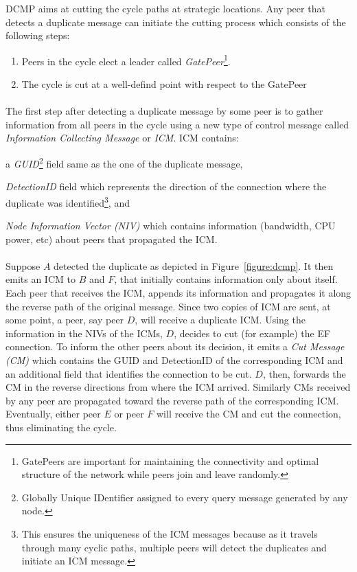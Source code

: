 \documentclass[a4paper,10pt]{article}
\begin{document}
DCMP aims at cutting the cycle paths at strategic locations. Any peer that detects a duplicate message can initiate the cutting process which consists of the following steps:
\begin{enumerate}
  \item Peers in the cycle elect a leader called \emph{GatePeer}\footnote{GatePeers are important for maintaining the connectivity and optimal structure of the network while peers join and leave randomly.}.
  \item The cycle is cut at a well-defind point with respect to the GatePeer
\end{enumerate}

\paragraph{}
The first step after detecting a duplicate message by some peer is to gather information from all peers in the cycle using a new type of control message called \emph{Information Collecting Message} or \emph{ICM}. ICM contains:
\begin{inparaenum}
  \item a \emph{GUID}\footnote{Globally Unique IDentifier assigned to every query message generated by any node.} field same as the one of the duplicate message,
  \item \emph{DetectionID} field which represents the direction of the connection where the duplicate was identified\footnote{This ensures the uniqueness of the ICM messages because as it travels through many cyclic paths, multiple peers will detect the duplicates and initiate an ICM message.}, and
  \item \emph{Node Information Vector (NIV)} which contains information (bandwidth, CPU power, etc) about peers that propagated the ICM.
\end{inparaenum}

\paragraph{}
Suppose $A$ detected the duplicate as depicted in Figure~\ref{figure:dcmp}. It then emits an ICM to $B$ and $F$, that initially contains information only about itself. Each peer that receives the ICM, appends its information and propagates it along the reverse path of the original message. Since two copies of ICM are sent, at some point, a peer, say peer $D$, will receive a duplicate ICM. Using the information in the NIVs of the ICMs, $D$, decides to cut (for example) the EF connection. To inform the other peers about its decision, it emits a \emph{Cut Message (CM)} which contains the GUID and DetectionID of the corresponding ICM and an additional field that identifies the connection to be cut. $D$, then, forwards the CM in the reverse directions from where the ICM arrived. Similarly CMs received by any peer are propagated toward the reverse path of the corresponding ICM. Eventually, either peer $E$ or peer $F$ will receive the CM and cut the connection, thus eliminating the cycle.
\end{document}
